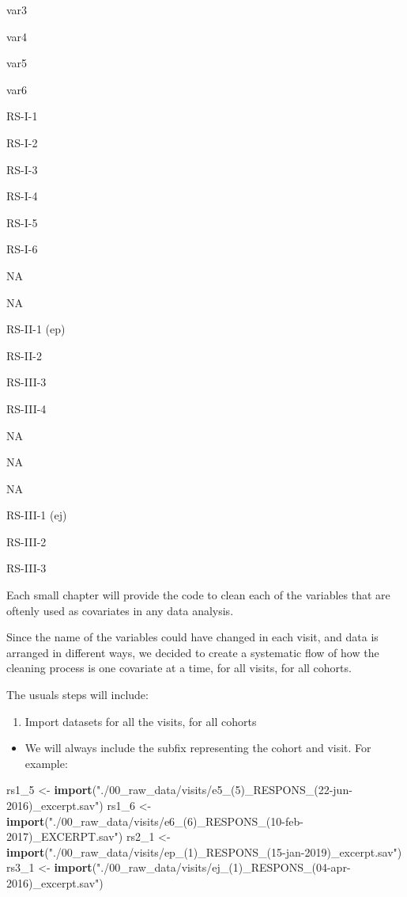 \documentclass[]{book}
\newenvironment{Shaded}{\begin{snugshade}}{\end{snugshade}}
\newcommand{\DecValTok}[1]{\textcolor[rgb]{0.00,0.00,0.81}{#1}}
\newcommand{\KeywordTok}[1]{\textcolor[rgb]{0.13,0.29,0.53}{\textbf{#1}}}
\newcommand{\NormalTok}[1]{#1}
\newcommand{\StringTok}[1]{\textcolor[rgb]{0.31,0.60,0.02}{#1}}
\providecommand{\tightlist}{%
  \setlength{\itemsep}{0pt}\setlength{\parskip}{0pt}}
\begin{document}
var3

var4

var5

var6

RS-I-1

RS-I-2

RS-I-3

RS-I-4

RS-I-5

RS-I-6

NA

NA

RS-II-1 (ep)

RS-II-2

RS-III-3

RS-III-4

NA

NA

NA

RS-III-1 (ej)

RS-III-2

RS-III-3

Each small chapter will provide the code to clean each of the variables that are oftenly used as covariates in any data analysis.

Since the name of the variables could have changed in each visit, and data is arranged in different ways, we decided to create a systematic flow of how the cleaning process is one covariate at a time, for all visits, for all cohorts.

The usuals steps will include:

\begin{enumerate}
\def\labelenumi{\arabic{enumi}.}
\tightlist
\item
  Import datasets for all the visits, for all cohorts
\end{enumerate}

\begin{itemize}
\tightlist
\item
  We will always include the subfix representing the cohort and visit. For example:
\end{itemize}

\begin{Shaded}
\begin{Highlighting}[]
\NormalTok{rs1_}\DecValTok{5}\NormalTok{ <-}\StringTok{ }\KeywordTok{import}\NormalTok{(}\StringTok{"./00_raw_data/visits/e5_(5)_RESPONS_(22-jun-2016)_excerpt.sav"}\NormalTok{)}
\NormalTok{rs1_}\DecValTok{6}\NormalTok{ <-}\StringTok{ }\KeywordTok{import}\NormalTok{(}\StringTok{"./00_raw_data/visits/e6_(6)_RESPONS_(10-feb-2017)_EXCERPT.sav"}\NormalTok{)}
\NormalTok{rs2_}\DecValTok{1}\NormalTok{ <-}\StringTok{ }\KeywordTok{import}\NormalTok{(}\StringTok{"./00_raw_data/visits/ep_(1)_RESPONS_(15-jan-2019)_excerpt.sav"}\NormalTok{)}
\NormalTok{rs3_}\DecValTok{1}\NormalTok{ <-}\StringTok{ }\KeywordTok{import}\NormalTok{(}\StringTok{"./00_raw_data/visits/ej_(1)_RESPONS_(04-apr-2016)_excerpt.sav"}\NormalTok{)}
\end{Highlighting}
\end{Shaded}
\end{document}
